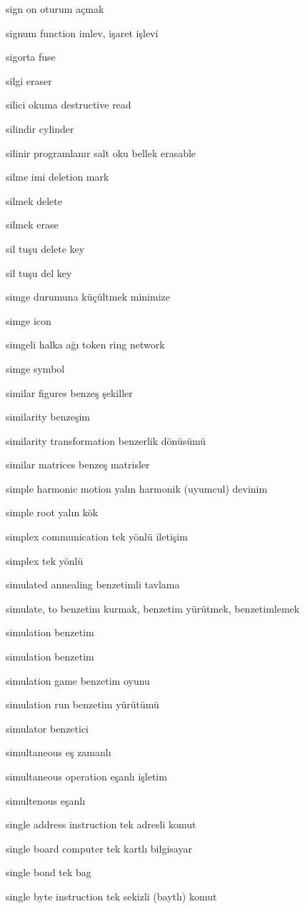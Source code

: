 \documentclass[12pt,fleqn]{article}\usepackage{../../common}
\begin{document}
sign on oturum açmak

signum function imlev, işaret işlevi

sigorta fuse

silgi eraser

silici okuma destructive read

silindir cylinder

silinir programlanır salt oku bellek erasable

silme imi deletion mark

silmek delete

silmek erase

sil tuşu delete key

sil tuşu del key

simge durumuna küçültmek minimize

simge icon

simgeli halka ağı token ring network

simge symbol

similar figures benzeş şekiller

similarity benzeşim

similarity transformation benzerlik dönüsümü

similar matrices benzeş matrisler

simple harmonic motion yalın harmonik (uyumcul) devinim

simple root yalın kök

simplex communication tek yönlü iletişim

simplex tek yönlü

simulated annealing benzetimli tavlama

simulate, to benzetim kurmak, benzetim yürütmek, benzetimlemek

simulation benzetim

simulation benzetim

simulation game benzetim oyunu

simulation run benzetim yürütümü

simulator benzetici

simultaneous eş zamanlı

simultaneous operation eşanlı işletim

simultenous eşanlı

single address instruction tek adresli komut

single board computer tek kartlı bilgisayar

single bond tek bag

single byte instruction tek sekizli (baytlı) komut
\end{document}
